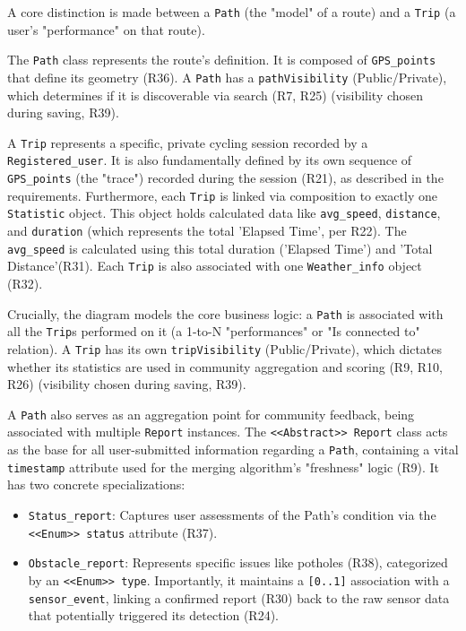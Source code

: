 A core distinction is made between a \texttt{Path} (the "model" of a route) and a \texttt{Trip} (a user's "performance" on that route).

The \texttt{Path} class represents the route's definition. It is composed of \texttt{GPS\_points} that define its geometry (R36). A \texttt{Path} has a \texttt{pathVisibility} (Public/Private), which determines if it is discoverable via search (R7, R25) (visibility chosen during saving, R39).

A \texttt{Trip} represents a specific, private cycling session recorded by a \texttt{Registered\_user}. It is also fundamentally defined by its own sequence of \texttt{GPS\_points} (the "trace") recorded during the session (R21), as described in the requirements. Furthermore, each \texttt{Trip} is linked via composition to exactly one \texttt{Statistic} object. This object holds calculated data like \texttt{avg\_speed}, \texttt{distance}, and \texttt{duration} (which represents the total 'Elapsed Time', per R22). The \texttt{avg\_speed} is calculated using this total duration ('Elapsed Time') and 'Total Distance'(R31). Each \texttt{Trip} is also associated with one \texttt{Weather\_info} object (R32).

Crucially, the diagram models the core business logic: a \texttt{Path} is associated with all the \texttt{Trip}s performed on it (a 1-to-N "performances" or "Is connected to" relation). A \texttt{Trip} has its own \texttt{tripVisibility} (Public/Private), which dictates whether its statistics are used in community aggregation and scoring (R9, R10, R26) (visibility chosen during saving, R39).

A \texttt{Path} also serves as an aggregation point for community feedback, being associated with multiple \texttt{Report} instances. The \texttt{<<Abstract>> Report} class acts as the base for all user-submitted information regarding a \texttt{Path}, containing a vital \texttt{timestamp} attribute used for the merging algorithm's "freshness" logic (R9). It has two concrete specializations:
\begin{itemize}[noitemsep, topsep=0pt]
    \item \texttt{Status\_report}: Captures user assessments of the Path's condition via the \texttt{<<Enum>> status} attribute (R37).
    \item \texttt{Obstacle\_report}: Represents specific issues like potholes (R38), categorized by an \texttt{<<Enum>> type}. Importantly, it maintains a \texttt{[0..1]} association with a \texttt{sensor\_event}, linking a confirmed report (R30) back to the raw sensor data that potentially triggered its detection (R24).
\end{itemize}

